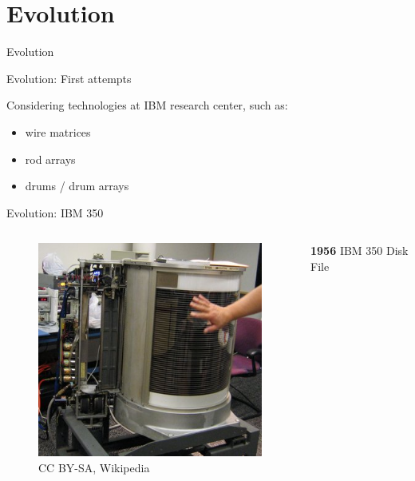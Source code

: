 \documentclass[12pt]{beamer}
\newlength{\wideitemsep}
\let\olditem\item
\renewcommand{\item}{\setlength{\itemsep}{\wideitemsep}\olditem}
\begin{document}
\section{Evolution}
\begin{frame}[standout]
	Evolution
\end{frame}
\begin{frame}[fragile]{Evolution: First attempts}

	Considering technologies at IBM research center, such as:
	\begin{itemize}
		\item wire matrices
		\item rod arrays
		\item drums / drum arrays
	\end{itemize}
\end{frame}

\begin{frame}[fragile]{Evolution: IBM 350}
	\begin{columns}[c]
	\begin{column}[c]{.5\textwidth}	
 		\begin{figure}[c]
	 		\centering
	 		\includegraphics[width=\linewidth]{img/ibm_350.jpg}
	 			\caption{CC BY-SA, Wikipedia}
 		\end{figure}
 	\end{column}
 	
	\begin{column}[c]{.5\textwidth}
		\textbf{1956} IBM 350 Disk File
	\end{column}
	\end{columns}
\end{frame}
\end{document}
